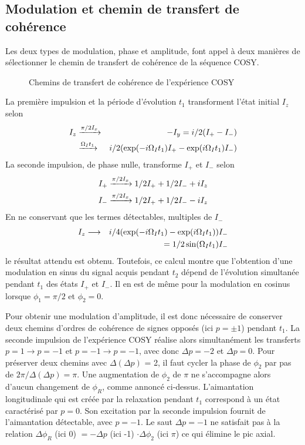 \subsection{Modulation et chemin de transfert de cohérence}
Les deux types de modulation, phase et amplitude, font appel à deux
manières de sélectionner le chemin de transfert de cohérence de la séquence
COSY.

\begin{figure}[hbt]
\begin{center}

\caption{\label{fig:cosycoherence}
Chemins de transfert de cohérence de l'expérience COSY}
\end{center}
\end{figure}

La première impulsion et la période d'évolution $t_1$
transforment l'état initial $I_z$ selon
\begin{eqnarray}
I_z  & \xrightarrow{\pi/2 I_x} & -I_y = i/2(I_+ - I_-) \\
     & \xrightarrow{\Omega_I t_1 } & i/2(\exp(-i \Omega_I t_1) I_+ - \exp(i \Omega_I t_1) I_-)
\end{eqnarray}
La seconde impulsion, de phase nulle, transforme $I_+$ et $I_-$ selon
\begin{eqnarray}
I_+ \xrightarrow{\pi/2 I_x} 1/2 I_+ + 1/2 I_- + i I_z \\
I_- \xrightarrow{\pi/2 I_x} 1/2 I_+ + 1/2 I_- - i I_z
\end{eqnarray}
En ne conservant que les termes détectables, multiples de $I_-$
\begin{eqnarray}
I_z & \longrightarrow & i/4 (\exp(-i \Omega_I t_1) - \exp(i \Omega_I t_1)) I_- \\
 & & = 1/2 \sin(\Omega_I t_1) I_-
\end{eqnarray}
le résultat attendu est obtenu.
Toutefois, ce calcul montre que l'obtention d'une modulation 
en sinus du signal acquis pendant $t_2$ dépend de l'évolution simultanée
pendant $t_1$ des états $I_+$ et $I_-$.
Il en est de même pour la modulation en cosinus lorsque $\phi_1 = \pi/2$
et $\phi_2 = 0$.

Pour obtenir une modulation d'amplitude, il est donc nécessaire
de conserver deux chemins d'ordres de cohérence de signes opposés
(ici $p = \pm 1$) pendant $t_1$.
La seconde impulsion de l'expérience COSY réalise alors simultanément
les transferts $p=1 \rightarrow p=-1$ et $p=-1 \rightarrow p=-1$,
avec donc $\Delta p = -2$ et $\Delta p = 0$.
Pour préserver deux chemins avec $\Delta(\Delta p)$ = 2, il
faut cycler la phase de $\phi_2$ par pas de $2\pi / \Delta(\Delta p) = \pi$.
Une augmentation de $\phi_2$ de $\pi$ ne s'accompagne alors 
d'aucun changement de $\phi_R$, comme annoncé ci-dessus.
L'aimantation longitudinale qui est créée par la relaxation pendant $t_1$
correspond à un état caractérisé par $p = 0$.
Son excitation par la seconde impulsion fournit
de l'aimantation détectable, avec $p = -1$.
Le saut $\Delta p = -1$ ne satisfait pas à la relation
$\Delta \phi_R $ (ici 0) $= - \Delta p$ (ici -1) $\cdot \Delta \phi_2$
(ici $\pi$) ce qui élimine le pic axial.

